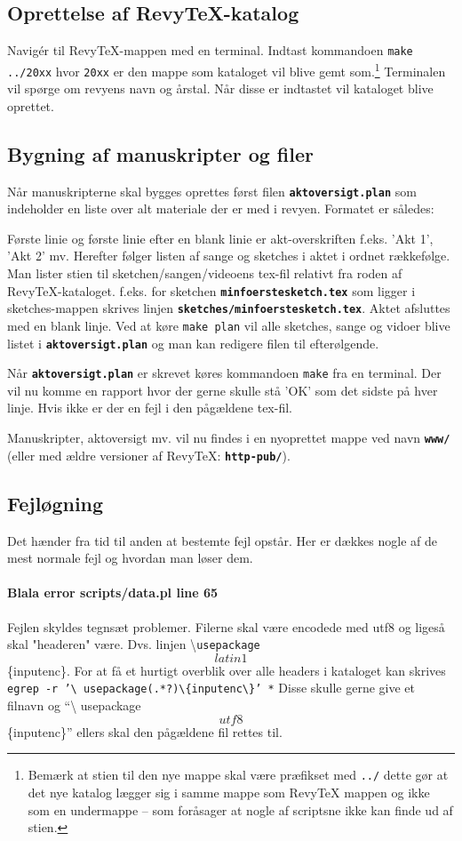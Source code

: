\documentclass{article}
\newcommand{\fname}[1]{\textbf{\texttt{#1}}}
\newcommand{\cmd}[1]{\textbackslash \texttt{#1}}
\newcommand{\shellcmd}[1]{\texttt{#1}}
\begin{document}
\subsection{Oprettelse af RevyTeX-katalog}
Navigér til RevyTeX-mappen med en terminal. Indtast kommandoen \shellcmd{make
../20xx} hvor \texttt{20xx} er den mappe som kataloget vil blive gemt
som.\footnote{Bemærk at stien til den nye mappe skal være præfikset med \shellcmd{../}
dette gør at det nye katalog lægger sig i samme mappe som RevyTeX mappen
og ikke som en undermappe -- som foråsager at nogle af scriptsne ikke
kan finde ud af stien.}
Terminalen vil spørge om revyens navn og årstal. Når disse er indtastet
vil kataloget blive oprettet.

\subsection{Bygning af manuskripter og filer}
Når manuskripterne skal bygges oprettes først filen
\fname{aktoversigt.plan}
som indeholder en liste over alt materiale der er med i revyen. Formatet
er således:

Første linie og første linie efter en blank linie er akt-overskriften
f.eks. 'Akt 1', 'Akt 2' mv. Herefter følger listen af sange og sketches
i aktet i ordnet rækkefølge. Man lister stien til
sketchen/sangen/videoens tex-fil relativt fra roden af
RevyTeX-kataloget. f.eks. for sketchen \fname{minfoerstesketch.tex} som ligger
i sketches-mappen skrives linjen \fname{sketches/minfoerstesketch.tex}. Aktet
afsluttes med en blank linje. Ved at køre \shellcmd{make plan} vil alle
sketches, sange og vidoer blive listet i \fname{aktoversigt.plan} og man
kan redigere filen til efterølgende.

Når \fname{aktoversigt.plan} er skrevet køres kommandoen \shellcmd{make} fra en terminal.
Der vil nu komme en rapport hvor der gerne skulle stå 'OK' som det
sidste på hver linje. Hvis ikke er der en fejl i den pågældene tex-fil.

Manuskripter, aktoversigt mv. vil nu findes i en nyoprettet mappe ved
navn \fname{www/} (eller med ældre versioner af RevyTeX:
\fname{http-pub/}).
\subsection{Fejløgning}
Det hænder fra tid til anden at bestemte fejl opstår. Her er dækkes
nogle af de mest normale fejl og hvordan man løser dem.
\paragraph{Blala error scripts/data.pl line 65}
Fejlen skyldes tegnsæt problemer. Filerne skal være encodede med utf8 og
ligeså skal "headeren" være. Dvs. linjen
\cmd{usepackage}\[latin1\]\{inputenc\}.
For at få et hurtigt overblik over alle headers i kataloget kan skrives
\shellcmd{egrep -r '\textbackslash
usepackage(.*?)\textbackslash\{inputenc\textbackslash\}' *}
Disse skulle gerne give et filnavn og ``\textbackslash
usepackage\[utf8\]\{inputenc\}'' ellers skal den pågældene fil rettes
til.
\end{document}
